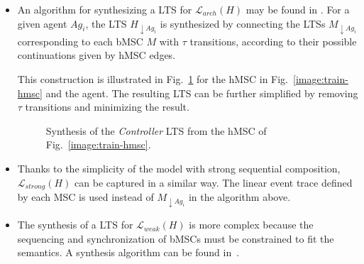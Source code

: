 \begin{itemize}
\item An algorithm for synthesizing a LTS for $\mathcal{L}_{arch}(H)$ may be found in \cite{Uchitel:2003}. For a given agent $Ag_{i}$, the LTS $H_{\downarrow Ag_i}$ is synthesized by connecting the LTSs $M_{\downarrow Ag_i}$ corresponding to each bMSC $M$ with $\tau$ transitions, according to their possible continuations given by hMSC edges. 

This construction is illustrated in Fig.~\ref{image:train-controller-synthesis} for the hMSC in Fig.~\ref{image:train-hmsc} and the  agent. The resulting LTS can be further simplified by removing $\tau$ transitions and minimizing the result.
\vspace{0.4cm}
\begin{figure}[H]\centering
{}
\caption[Synthesis of a LTS from a hMSC]{Synthesis of the \emph{Controller} LTS from the hMSC of Fig.~\ref{image:train-hmsc}.\label{image:train-controller-synthesis}}
\end{figure}

\item Thanks to the simplicity of the model with strong sequential composition, $\mathcal{L}_{strong}(H)$ can be captured in a similar way. The linear event trace defined by each MSC is used instead of $M_{\downarrow Ag_i}$ in the algorithm above.

\item The synthesis of a LTS for $\mathcal{L}_{weak}(H)$ is more complex because the sequencing and synchronization of bMSCs must be constrained to fit the semantics. A synthesis algorithm can be found in~\cite{Uchitel:2004}.
\end{itemize}

